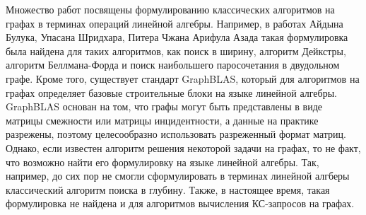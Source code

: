 



{\progress}
Множество работ посвящены формулированию классических алгоритмов на графах в терминах операций линейной алгебры. Например, в работах Айдына Булука, Упасана Шридхара, Питера Чжана Арифула Азада такая формулировка была найдена для таких алгоритмов, как поиск в ширину, алгоритм Дейкстры, алгоритм Беллмана-Форда и поиск наибольшего паросочетания в двудольном графе. Кроме того, существует стандарт GraphBLAS, который для алгоритмов на графах определяет базовые строительные блоки на языке линейной алгебры. GraphBLAS основан на том, что графы могут быть представлены в виде матрицы смежности или матрицы инцидентности, а данные на практике разрежены, поэтому целесообразно использовать разреженный формат матриц. Однако, если известен алгоритм решения некоторой задачи на графах, то не факт, что возможно найти его формулировку на языке линейной алгебры. Так, например, до сих пор не смогли сформулировать в терминах линейной алгберы классический алгоритм поиска в глубину. Также, в настоящее время, такая формулировка не найдена и для алгоритмов вычисления КС-запросов на графах.

